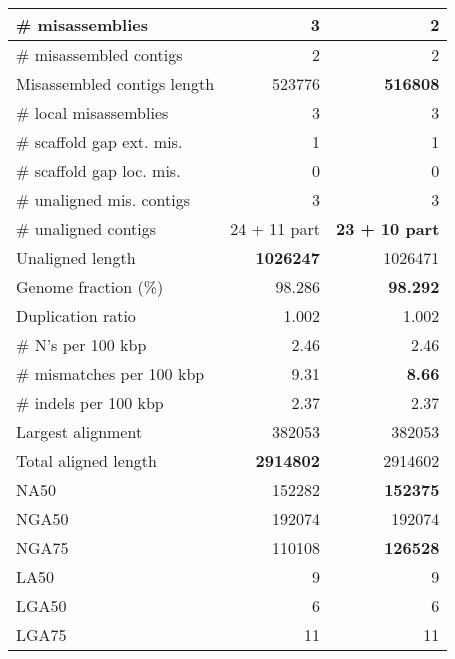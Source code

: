 \documentclass[12pt,a4paper]{article}
\begin{document}
\begin{table}[ht]
\begin{center}
\begin{tabular}{|l*{2}{|r}|}
\# misassemblies & 3 & {\bf 2} \\ \hline
\# misassembled contigs & 2 & 2 \\ \hline
Misassembled contigs length & 523776 & {\bf 516808} \\ \hline
\# local misassemblies & 3 & 3 \\ \hline
\# scaffold gap ext. mis. & 1 & 1 \\ \hline
\# scaffold gap loc. mis. & 0 & 0 \\ \hline
\# unaligned mis. contigs & 3 & 3 \\ \hline
\# unaligned contigs & 24 + 11 part & {\bf 23 + 10 part} \\ \hline
Unaligned length & {\bf 1026247} & 1026471 \\ \hline
Genome fraction (\%) & 98.286 & {\bf 98.292} \\ \hline
Duplication ratio & 1.002 & 1.002 \\ \hline
\# N's per 100 kbp & 2.46 & 2.46 \\ \hline
\# mismatches per 100 kbp & 9.31 & {\bf 8.66} \\ \hline
\# indels per 100 kbp & 2.37 & 2.37 \\ \hline
Largest alignment & 382053 & 382053 \\ \hline
Total aligned length & {\bf 2914802} & 2914602 \\ \hline
NA50 & 152282 & {\bf 152375} \\ \hline
NGA50 & 192074 & 192074 \\ \hline
NGA75 & 110108 & {\bf 126528} \\ \hline
LA50 & 9 & 9 \\ \hline
LGA50 & 6 & 6 \\ \hline
LGA75 & 11 & 11 \\ \hline
\end{tabular}
\end{center}
\end{table}
\end{document}
